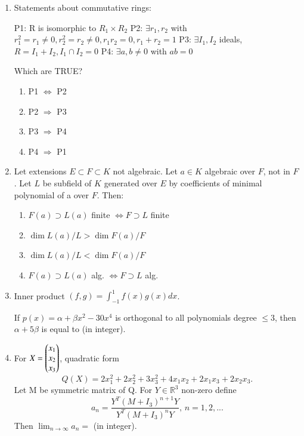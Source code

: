 \documentclass[journal,12pt,onecolumn]{IEEEtran}
\theoremstyle{remark}
\begin{document}
\begin{enumerate}
\item Statements about commutative rings:  

P1: R is isomorphic to $R_1\times R_2$  
P2: $\exists r_1,r_2$ with $r_1^2=r_1\neq 0, r_2^2=r_2\neq 0, r_1r_2=0, r_1+r_2=1$  
P3: $\exists I_1,I_2$ ideals, $R=I_1+I_2, I_1\cap I_2=0$  
P4: $\exists a,b\neq0$ with $ab=0$  

Which are TRUE?  

\begin{enumerate}
\item P1 $\Leftrightarrow$ P2
\item P2 $\Rightarrow$ P3
\item P3 $\Rightarrow$ P4
\item P4 $\Rightarrow$ P1
\end{enumerate}
\hfill{}

\item Let extensions $E\subset F\subset K$ not algebraic. Let $a\in K$ algebraic over $F$, not in $F$. Let $L$ be subfield of $K$ generated over $E$ by coefficients of minimal polynomial of a over $F$. Then:  

\begin{enumerate}
\item $F(a)\supset L(a)$ finite $\Leftrightarrow F\supset L$ finite
\item $\dim L(a)/L > \dim F(a)/F$
\item $\dim L(a)/L < \dim F(a)/F$
\item $F(a)\supset L(a)$ alg. $\Leftrightarrow F\supset L$ alg.
\end{enumerate}
\hfill{}

\item Inner product $(f,g)=\int_{-1}^1 f(x)g(x) dx$.  

If $p(x)=\alpha+\beta x^2-30x^4$ is orthogonal to all polynomials degree $\le 3$, then $\alpha+5\beta$ is equal to \underline{\hspace{2cm}} (in integer).  
\hfill{}

\item For $X=\begin{pmatrix}x_1 \\ x_2 \\ x_3\end{pmatrix}$, quadratic form  
$$
Q(X)=2x_1^2+2x_2^2+3x_3^2+4x_1x_2+2x_1x_3+2x_2x_3.
$$  
Let M be symmetric matrix of Q. For $Y\in\mathbb{R}^3$ non-zero define  
$$
a_n=\frac{Y^T(M+I_3)^{n+1}Y}{Y^T(M+I_3)^nY}, \, n=1,2,...
$$  
Then $\lim_{n\to\infty}a_n=$ \underline{\hspace{2cm}} (in integer).  
\hfill{}


\end{enumerate}
\end{document}
